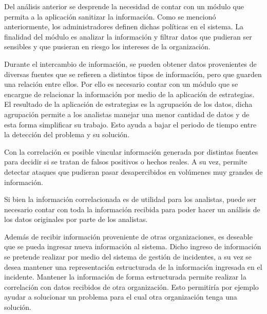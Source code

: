 {
	Del análisis anterior se desprende la necesidad de contar con un módulo que permita a la aplicación sanitizar la
	información. Como se mencionó anteriormente, los administradores definen dichas políticas en el sistema. La finalidad
	del módulo es analizar la información y filtrar datos que pudieran ser sensibles y que pusieran en riesgo los intereses
	de la organización.}


\bigskip

{
	Durante el intercambio de información, se pueden obtener datos provenientes de diversas fuentes que se refieren a
	distintos tipos de información, pero que guarden una relación entre ellos. Por ello es necesario contar con un módulo
	que se encargue de relacionar la información por medio de la aplicación de estrategias. El resultado de la aplicación
	de estrategias es la agrupación de los datos, dicha agrupación permite a los analistas manejar una menor cantidad de
	datos y de esta forma simplificar su trabajo. Esto ayuda a bajar el periodo de tiempo entre la detección del problema y
	su solución.}

{
	Con la correlación es posible vincular información generada por distintas fuentes para decidir si se tratan de falsos
	positivos o hechos reales. A su vez, permite detectar ataques que pudieran pasar desapercibidos en volúmenes muy
	grandes de información.}

{
	Si bien la información correlacionada es de utilidad para los analistas, puede ser necesario contar con toda la
	información recibida para poder hacer un análisis de los datos originales por parte de los analistas.}


\bigskip

{
	Además de recibir información proveniente de otras organizaciones, es deseable que se pueda ingresar nueva información
	al sistema. Dicho ingreso de información se pretende realizar por medio del sistema de gestión de incidentes, a su vez
	se desea mantener una representación estructurada de la información ingresada en el incidente. Mantener la información
	de forma estructurada permite realizar la correlación con datos recibidos de otra organización. Esto permitiría por
	ejemplo ayudar a solucionar un problema para el cual otra organización tenga una solución.}


